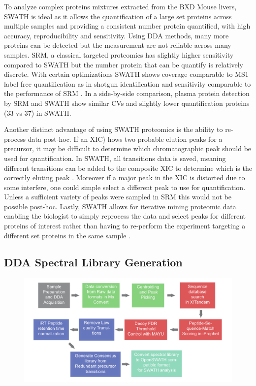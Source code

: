 \documentclass[a4paper,11pt,twoside]{book}
\begin{document}
	To analyze complex proteins mixtures extracted from the BXD Mouse livers, SWATH is ideal as it allows the quantification of a large set proteins across multiple samples and providing a consistent number protein quantified, with high accuracy, reproducibility and sensitivity. Using DDA methods, many more proteins can be detected but the measurement are not reliable across many samples. SRM, a classical targeted proteomics has slightly higher sensitivity compared to SWATH but the number protein that can be quantify is relatively discrete. With certain optimizations SWATH shows coverage comparable to MS1 label free quantification as in shotgun identification and sensitivity comparable to the performance of SRM \citep{Liu2013QuantitativeSWATH-MS}. In a side-by-side comparison, plasma protein detection by SRM and SWATH \citep{Liu2013QuantitativeSWATH-MS} show similar CVs and slightly lower quantification proteins (33 vs 37) in SWATH. 
	
	Another distinct advantage of using SWATH proteomics is the ability to re-process data post-hoc. If an XIC) hows two probable elution peaks for a precursor, it may be difficult to determine which chromatographic peak should be used for quantification. In SWATH, all transitions data is saved, meaning different transitions can be added to the composite XIC to determine which is the correctly eluting peak \citep{Gillet2012TargetedAnalysis}. Moreover if a major peak in the XIC is distorted due to some interfere, one could simple select a different peak to use for quantification. Unless a sufficient variety of peaks were sampled in SRM this would not be possible post-hoc\citep{Gillet2012TargetedAnalysis}. Lastly, SWATH allows for iterative mining proteomic data enabling the biologist to simply reprocess the data and select peaks for different proteins of interest rather than having to re-perform the experiment targeting a different set proteins in the same sample \citep{Gillet2012TargetedAnalysis}.
	
	
	
	
	\subsection{DDA Spectral Library Generation}
	
	\begin{figure}[ht]
		\centering
		\includegraphics[width=\linewidth]{3.Proteomics/Spectral_Library_Gen.pdf}
		\label{Spectral Library Generation Road Map}
	\end{figure}
	
\end{document}

